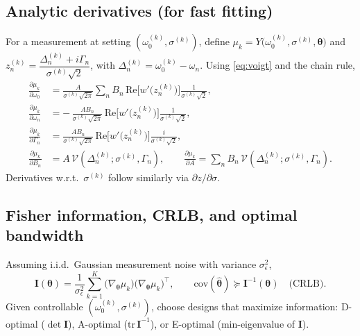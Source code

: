 \documentclass[aps,prb,amsmath,amssymb]{revtex4-2} %
\begin{document}
    \subsection{Analytic derivatives (for fast fitting)}
        For a measurement at setting $(\omega_0^{(k)},\sigma^{(k)})$, define
        $\mu_k=Y\big(\omega_0^{(k)},\sigma^{(k)},\boldsymbol{\theta}\big)$ and
        $z_n^{(k)}=\dfrac{\Delta_n^{(k)}+i\Gamma_n}{\sigma^{(k)}\sqrt{2}}$, with $\Delta_n^{(k)}=\omega_0^{(k)}-\omega_n$.
        Using \eqref{eq:voigt} and the chain rule,
        \begin{align}
            \frac{\partial \mu_k}{\partial \omega_0}
            &= \frac{A}{\sigma^{(k)}\sqrt{2\pi}}\sum_{n} B_n\,
            \mathrm{Re}\!\Big[w'\!\big(z_n^{(k)}\big)\Big]\frac{1}{\sigma^{(k)}\sqrt{2}},\\[3pt]
            \frac{\partial \mu_k}{\partial \omega_n}
            &= -\,\frac{A B_n}{\sigma^{(k)}\sqrt{2\pi}}\,
            \mathrm{Re}\!\Big[w'\!\big(z_n^{(k)}\big)\Big]\frac{1}{\sigma^{(k)}\sqrt{2}},\\[3pt]
            \frac{\partial \mu_k}{\partial \Gamma_n}
            &= \frac{A B_n}{\sigma^{(k)}\sqrt{2\pi}}\,
            \mathrm{Re}\!\Big[w'\!\big(z_n^{(k)}\big)\Big]\frac{i}{\sigma^{(k)}\sqrt{2}},\\[3pt]
            \frac{\partial \mu_k}{\partial B_n}
            &= A\,\mathcal{V}\!\left(\Delta_n^{(k)};\sigma^{(k)},\Gamma_n\right),\qquad
            \frac{\partial \mu_k}{\partial A}=\sum_n B_n\,\mathcal{V}\!\left(\Delta_n^{(k)};\sigma^{(k)},\Gamma_n\right).
        \end{align}
        Derivatives w.r.t.\ $\sigma^{(k)}$ follow similarly via $\partial z/\partial \sigma$.

    \subsection{Fisher information, CRLB, and optimal bandwidth}
        Assuming i.i.d.\ Gaussian measurement noise with variance $\sigma_\epsilon^2$,
        \begin{equation}
            \mathbf I(\boldsymbol{\theta})
            =\frac{1}{\sigma_\epsilon^2}\sum_{k=1}^{K}
            \big(\nabla_{\!\boldsymbol{\theta}}\mu_k\big)\big(\nabla_{\!\boldsymbol{\theta}}\mu_k\big)^{\!\top},
            \qquad
            \mathrm{cov}(\hat{\boldsymbol{\theta}})\succeq \mathbf I^{-1}(\boldsymbol{\theta})\quad\text{(CRLB)}.
        \end{equation}
        Given controllable $(\omega_0^{(k)},\sigma^{(k)})$, choose designs that maximize information:
        D-optimal ($\det\mathbf I$), A-optimal ($\mathrm{tr}\,\mathbf I^{-1}$), or E-optimal (min-eigenvalue of $\mathbf I$).
\end{document}
